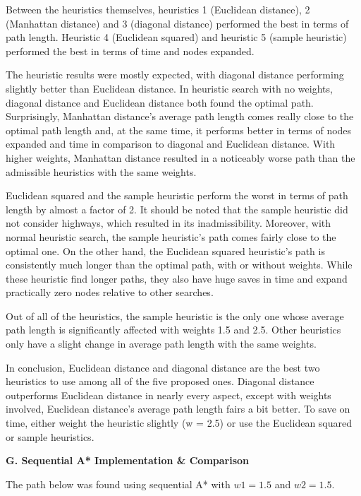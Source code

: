 \documentclass[12pt, letterpaper]{article}
\begin{document}
Between the heuristics themselves, heuristics 1 (Euclidean distance), 2 (Manhattan distance) and 3 (diagonal distance) performed the best in terms of path length. Heuristic 4 (Euclidean squared) and heuristic 5 (sample heuristic) performed the best in terms of time and nodes expanded.

The heuristic results were mostly expected, with diagonal distance performing slightly better than Euclidean distance. In heuristic search with no weights, diagonal distance and Euclidean distance both found the optimal path. Surprisingly, Manhattan distance's average path length comes really close to the optimal path length and, at the same time, it performs better in terms of nodes expanded and time in comparison to diagonal and Euclidean distance. With higher weights, Manhattan distance resulted in a noticeably worse path than the admissible heuristics with the same weights. 

Euclidean squared and the sample heuristic perform the worst in terms of path length by almost a factor of 2. It should be noted that the sample heuristic did not consider highways, which resulted in its inadmissibility. Moreover, with normal heuristic search, the sample heuristic's path comes fairly close to the optimal one. On the other hand, the Euclidean squared heuristic's path is consistently much longer than the optimal path, with or without weights. While these heuristic find longer paths, they also have huge saves in time and expand practically zero nodes relative to other searches.

Out of all of the heuristics, the sample heuristic is the only one whose average path length is significantly affected with weights 1.5 and 2.5. Other heuristics only have a slight change in average path length with the same weights.


In conclusion, Euclidean distance and diagonal distance are the best two heuristics to use among all of the five proposed ones. Diagonal distance outperforms Euclidean distance in nearly every aspect, except with weights involved, Euclidean distance's average path length fairs a bit better. To save on time, either weight the heuristic slightly (w = 2.5) or use the Euclidean squared or sample heuristics. 

\pagebreak %

\noindent \textbf{G. Sequential A* Implementation \& Comparison}

The path below was found using sequential A* with $w1 = 1.5$ and $w2 = 1.5$.
\end{document}
